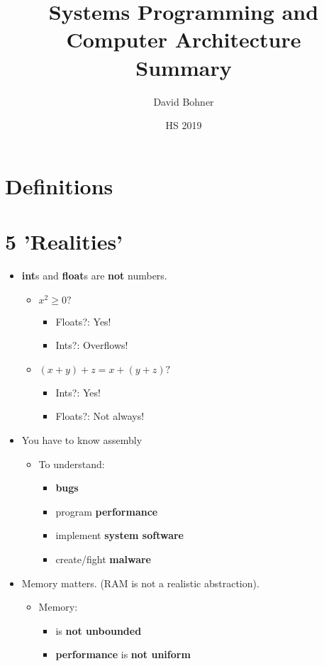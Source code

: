 \documentclass[12pt,a4paper]{article}
\author{David Bohner}
\title{Systems Programming and Computer Architecture \\ Summary}
\date{HS 2019}
\begin{document}
\maketitle
\tableofcontents
\newpage
\section{Definitions}

\section{5 'Realities'}
\begin{itemize}
	\item \textbf{int}s and \textbf{float}s are \textbf{not} numbers.
		\begin{itemize}
			\item $x^2 \geq 0?$
			\begin{itemize}
				\item Floats?: Yes!
				\item Ints?: Overflows!
			\end{itemize}
			\item $(x+y)+z = x+(y+z)?$
			\begin{itemize}
				\item Ints?: Yes!
				\item Floats?: Not always!
			\end{itemize}
		\end{itemize}
	\item You have to know assembly
		\begin{itemize}
			\item To understand:
			\begin{itemize}
				\item \textbf{bugs}
				\item program \textbf{performance}
				\item implement \textbf{system software}
				\item create/fight \textbf{malware}
			\end{itemize}
		\end{itemize}
	\item Memory matters. (RAM is not a realistic abstraction).
		\begin{itemize}
			\item Memory:
			\begin{itemize}
				\item is \textbf{not unbounded}
				\item \textbf{performance} is \textbf{not uniform}

\end{itemize}
\end{itemize}
\end{itemize}
\end{document}
